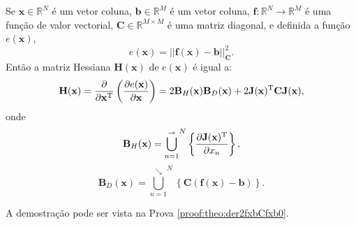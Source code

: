 \begin{theorem}\label{theo:der2fxbCfxb0}
Se 
$\mathbf{x}\in \mathbb{R}^N$ é um vetor coluna, 
$\mathbf{b}\in \mathbb{R}^M$ é um vetor coluna,  
$\mathbf{f}: \mathbb{R}^{N}\rightarrow \mathbb{R}^{M}$ é uma função de valor vectorial,
$\mathbf{C} \in \mathbb{R}^{M\times M}$ é uma matriz diagonal, e
definida a função $e(\mathbf{x})$,
\begin{equation}
e(\mathbf{x})= ||\mathbf{f}(\mathbf{x})-\mathbf{b}||_{\mathbf{C}}^2.
\end{equation}
Então a matriz Hessiana $\mathbf{H}(\mathbf{x})$ de $e(\mathbf{x})$ é igual a:
\begin{equation}
\mathbf{H}(\mathbf{x}) = \frac{\partial}{\partial \mathbf{x}^{\mathrm{T}}}\left(  
\frac{\partial e(\mathbf{x}) }{\partial \mathbf{x}} \right) = 2 
\mathbf{B}_{H}(\mathbf{x}) \mathbf{B}_{D}(\mathbf{x})
+2 \mathbf{J}(\mathbf{x})^{\mathrm{T}}\mathbf{C} \mathbf{J}(\mathbf{x}),
\end{equation}
onde 
\begin{equation}
 \mathbf{B}_{H}(\mathbf{x})={\bigcup\limits_{n=1}^{\rightarrow}}^{N}\left\{\frac{\partial \mathbf{J}(\mathbf{x})^{\mathrm{T}} }{\partial x_{n}}\right\},
\end{equation}
\begin{equation}
 \mathbf{B}_{D}(\mathbf{x})={\bigcup\limits_{n=1}^{\searrow}}^{N}\left\{ \mathbf{C} \left( \mathbf{f}(\mathbf{x})-\mathbf{b} \right) \right\}. 
\end{equation}

A demostração pode ser vista na Prova \ref{proof:theo:der2fxbCfxb0}.
\end{theorem}

